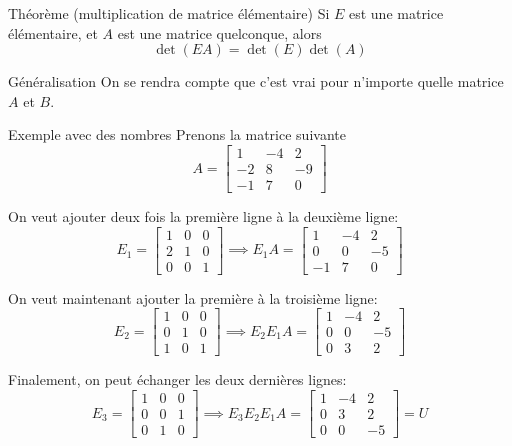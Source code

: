 \documentclass[a4paper]{article}
\begin{document}
\begin{parag}{Théorème (multiplication de matrice élémentaire)}
    Si $E$ est une matrice élémentaire, et $A$ est une matrice quelconque, alors
    \[\det\left(EA\right) = \det\left(E\right)\det\left(A\right)\]

    \begin{subparag}{Généralisation}
        On se rendra compte que c'est vrai pour n'importe quelle matrice $A$ et $B$.
    \end{subparag}
\end{parag}

\begin{parag}{Exemple avec des nombres}
    Prenons la matrice suivante
    \[A = \begin{bmatrix} 1 & -4 & 2 \\ -2 & 8 & -9 \\ -1 & 7 & 0 \end{bmatrix} \]

    On veut ajouter deux fois la première ligne à la deuxième ligne:
    \[E_1 = \begin{bmatrix} 1 & 0 & 0 \\ 2 & 1 & 0 \\ 0 & 0 & 1 \end{bmatrix} \implies E_1 A = \begin{bmatrix} 1 & -4 & 2 \\ 0 & 0 & -5 \\ -1 & 7 & 0 \end{bmatrix} \]

    On veut maintenant ajouter la première à la troisième ligne:
    \[E_2 = \begin{bmatrix} 1 & 0 & 0 \\ 0 & 1 & 0 \\ 1 & 0 & 1 \end{bmatrix} \implies E_2 E_1 A = \begin{bmatrix} 1 & -4 & 2 \\ 0 & 0 & -5 \\ 0 & 3 & 2 \end{bmatrix}\]

    Finalement, on peut échanger les deux dernières lignes:
    \[E_3 = \begin{bmatrix} 1 & 0 & 0 \\ 0 & 0 & 1 \\ 0 & 1 & 0 \end{bmatrix} \implies E_3 E_2 E_1 A = \begin{bmatrix} 1 & -4 & 2 \\ 0 & 3 & 2 \\ 0 & 0 & -5 \end{bmatrix} = U\]


\end{parag}
\end{document}
